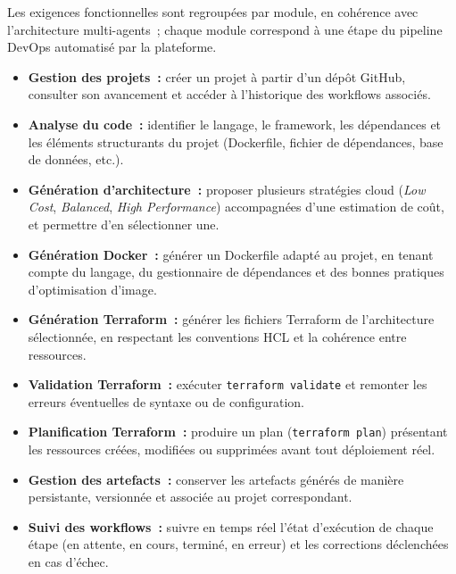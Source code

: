 Les exigences fonctionnelles sont regroupées par module, en cohérence avec l'architecture
multi-agents~; chaque module correspond à une étape du pipeline DevOps automatisé par la
plateforme.

\begin{itemize}
    \item \textbf{Gestion des projets~:} créer un projet à partir d'un dépôt GitHub,
    consulter son avancement et accéder à l'historique des workflows associés.

    \item \textbf{Analyse du code~:} identifier le langage, le framework, les dépendances
    et les éléments structurants du projet (Dockerfile, fichier de dépendances, base de
    données, etc.).

    \item \textbf{Génération d'architecture~:} proposer plusieurs stratégies cloud
    (\textit{Low Cost}, \textit{Balanced}, \textit{High Performance}) accompagnées d'une
    estimation de coût, et permettre d'en sélectionner une.

    \item \textbf{Génération Docker~:} générer un Dockerfile adapté au projet, en tenant
    compte du langage, du gestionnaire de dépendances et des bonnes pratiques
    d'optimisation d'image.

    \item \textbf{Génération Terraform~:} générer les fichiers Terraform de l'architecture
    sélectionnée, en respectant les conventions HCL et la cohérence entre ressources.

    \item \textbf{Validation Terraform~:} exécuter \texttt{terraform validate} et remonter
    les erreurs éventuelles de syntaxe ou de configuration.

    \item \textbf{Planification Terraform~:} produire un plan (\texttt{terraform plan})
    présentant les ressources créées, modifiées ou supprimées avant tout déploiement réel.

    \item \textbf{Gestion des artefacts~:} conserver les artefacts générés de manière
    persistante, versionnée et associée au projet correspondant.

    \item \textbf{Suivi des workflows~:} suivre en temps réel l'état d'exécution de chaque
    étape (en attente, en cours, terminé, en erreur) et les corrections déclenchées en cas
    d'échec.
\end{itemize}

